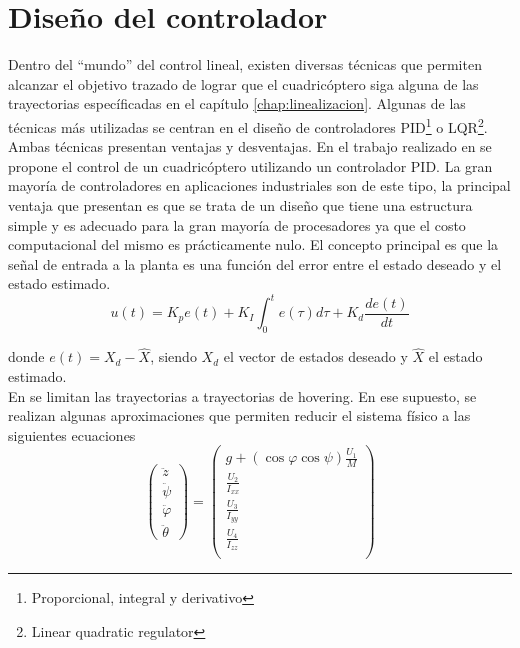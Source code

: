 \documentclass[main]{subfiles}
\begin{document}
\chapter{Diseño del controlador}
\label{chap:control}

Dentro del ``mundo'' del control lineal, existen diversas t\'ecnicas que permiten alcanzar el objetivo trazado de lograr que el cuadric\'optero siga alguna de las trayectorias espec\'ificadas en el cap\'itulo \ref{chap:linealizacion}. Algunas de las t\'ecnicas m\'as utilizadas se centran en el diseño de controladores PID\footnote{Proporcional, integral y derivativo} o LQR\footnote{Linear quadratic regulator}. Ambas t\'ecnicas presentan ventajas y desventajas. En el trabajo realizado en \cite{bib:quadrotor-bible} se propone el control de un cuadric\'optero utilizando un controlador PID. La gran mayor\'ia de controladores en aplicaciones industriales son de este tipo, la principal ventaja que presentan es que se trata de un diseño que tiene una estructura simple y es adecuado para la gran mayor\'ia de procesadores ya que el costo computacional del mismo es pr\'acticamente nulo. El concepto principal es que la señal de entrada a la planta es una funci\'on del error entre el estado deseado y el estado estimado.
\begin{equation}
u(t) = K_pe(t)+K_I\int_0^t e(\tau) d\tau +K_d\frac{de(t)}{dt}
\end{equation}

donde $e(t) = X_d-\hat{X}$, siendo $X_d$ el vector de estados deseado y $\hat{X}$ el estado estimado.\\

En \cite{bib:quadrotor-bible} se limitan las trayectorias a trayectorias de hovering. En ese supuesto, se realizan algunas aproximaciones que permiten reducir el sistema f\'isico a las siguientes ecuaciones
\begin{equation}
\left(
\begin{array}{c}
\ddot{z}\\
\ddot{\psi}\\
\ddot{\varphi} \\
\ddot{\theta}
\end{array}\right)
=\left(\begin{array}{c}
g+(\cos\varphi\cos\psi)\frac{U_1}{M}\\
 \frac{U_2}{I_{xx}} \\
 \frac{U_3}{I_{yy}} \\
 \frac{U_4}{I_{zz}} \\
\end{array}\right)
\end{equation}
\end{document}
